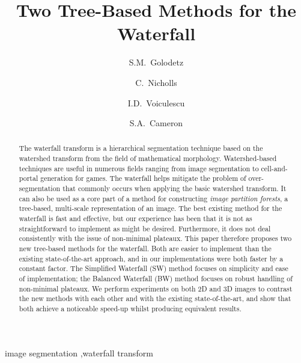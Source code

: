 \documentclass[preprint,a4paper]{elsarticle}
\begin{document}
\begin{frontmatter}

\title{Two Tree-Based Methods for the Waterfall}

\author[ox]{S.M.~Golodetz}

\author[ox]{C.~Nicholls}

\author[ox]{I.D.~Voiculescu}

\author[ox]{S.A.~Cameron}


\address[ox]{Department of Computer Science, University of Oxford, Wolfson Building, Parks Road, Oxford, OX1 3QD, United Kingdom}

\begin{abstract}
The waterfall transform is a hierarchical segmentation technique based on the watershed transform from the field of mathematical morphology. Watershed-based techniques are useful in numerous fields ranging from image segmentation to cell-and-portal generation for games. The waterfall helps mitigate the problem of over-segmentation that commonly occurs when applying the basic watershed transform. It can also be used as a core part of a method for constructing \emph{image partition forests}, a tree-based, multi-scale representation of an image. The best existing method for the waterfall is fast and effective, but our experience has been that it is not as straightforward to implement as might be desired. Furthermore, it does not deal consistently with the issue of non-minimal plateaux. This paper therefore proposes two new tree-based methods for the waterfall. Both are easier to implement than the existing state-of-the-art approach, and in our implementations were both faster by a constant factor. The Simplified Waterfall (SW) method focuses on simplicity and ease of implementation; the Balanced Waterfall (BW) method focuses on robust handling of non-minimal plateaux. We perform experiments on both 2D and 3D images to contrast the new methods with each other and with the existing state-of-the-art, and show that both achieve a noticeable speed-up whilst producing equivalent results.
\end{abstract}

\begin{keyword}
image segmentation \sep waterfall transform
\end{keyword}

\end{frontmatter}
\end{document}
